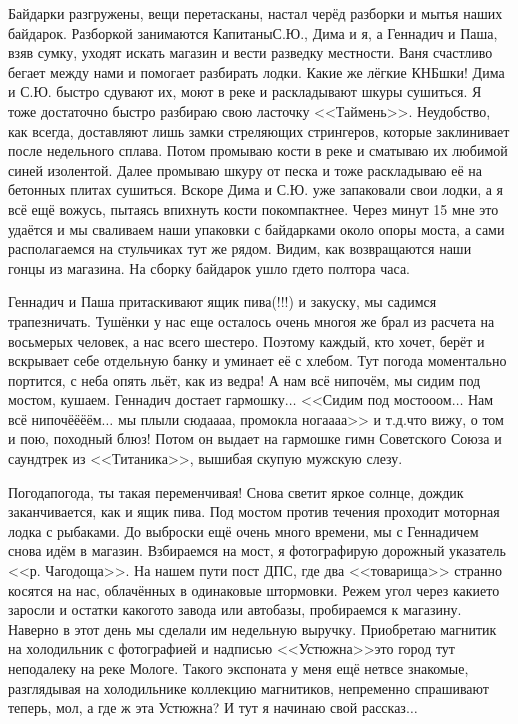 Байдарки разгружены, вещи перетасканы, настал черёд разборки и мытья наших байдарок. Разборкой занимаются Капитаны\mdash С.Ю., Дима и я, а Геннадич и Паша, взяв сумку, уходят искать магазин и вести разведку местности. Ваня счастливо бегает между нами и помогает разбирать лодки. Какие же лёгкие КНБ\sdash шки! Дима и С.Ю. быстро сдувают их, моют в реке и раскладывают шкуры сушиться. Я тоже достаточно быстро разбираю свою ласточку <<Таймень>>. Неудобство, как всегда, доставляют лишь замки стреляющих стрингеров, которые заклинивает после недельного сплава. Потом промываю кости в реке и сматываю их любимой синей изолентой. Далее промываю шкуру от песка и тоже раскладываю её на бетонных плитах сушиться. Вскоре Дима и С.Ю. уже запаковали свои лодки, а я всё ещё вожусь, пытаясь впихнуть кости покомпактнее. Через минут 15 мне это удаётся и мы сваливаем наши упаковки с байдарками около опоры моста, а сами располагаемся на стульчиках тут же рядом. Видим, как возвращаются наши гонцы из магазина. На сборку байдарок ушло где\sdash то полтора часа.

Геннадич и Паша притаскивают ящик пива(!!!) и закуску, мы садимся трапезничать. Тушёнки у нас еще осталось очень много\mdash я же брал из расчета на восьмерых человек, а нас всего шестеро. Поэтому каждый, кто хочет, берёт и вскрывает себе отдельную банку и уминает её с хлебом. Тут погода моментально портится, с неба опять льёт, как из ведра! А нам всё нипочём, мы сидим под мостом, кушаем. Геннадич достает гармошку$\ldots$ <<Сидим под мосто\sdash о\sdash ом$\ldots$ Нам всё нипочё\sdash ё\sdash ё\sdash ём$\ldots$ мы плыли сюда\sdash а\sdash а\sdash а, промокла нога\sdash а\sdash а\sdash а>> и т.д.\mdash что вижу, о том и пою, походный блюз! Потом он выдает на гармошке гимн Советского Союза и саундтрек из <<Титаника>>, вышибая скупую мужскую слезу. 

Погода\sdash погода, ты такая переменчивая! Снова светит яркое солнце, дождик заканчивается, как и ящик пива. Под мостом против течения проходит моторная лодка с рыбаками. До выброски ещё очень много времени, мы с Геннадичем снова идём в магазин.  Взбираемся на мост, я фотографирую дорожный указатель <<р. Чагодоща>>. На нашем пути пост ДПС, где два <<товарища>> странно косятся на нас, облачённых в одинаковые штормовки. Режем угол через какие\sdash то заросли и остатки какого\sdash то завода или автобазы, пробираемся к магазину. Наверно в этот день мы сделали им недельную выручку. Приобретаю магнитик на холодильник с фотографией и надписью <<Устюжна>>\mdash это город тут неподалеку на реке Мологе. Такого экспоната у меня ещё нет\mdash все знакомые, разглядывая на холодильнике коллекцию магнитиков, непременно спрашивают теперь, мол, а где ж эта Устюжна? И тут я начинаю свой рассказ$\ldots$

